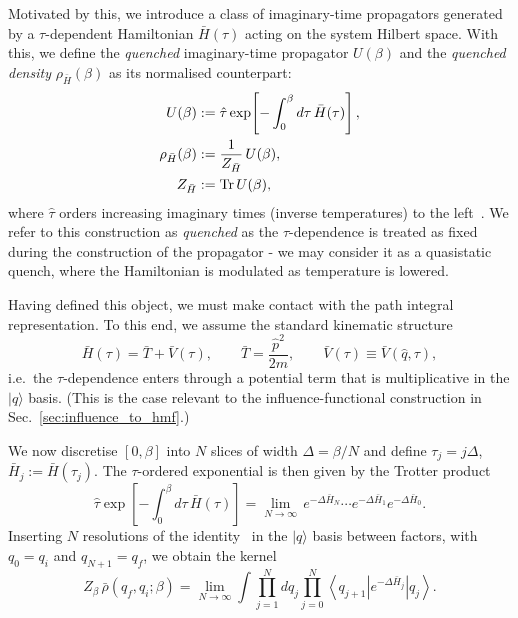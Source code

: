 Motivated by this, we introduce a class of imaginary-time propagators generated by a $\tau$-dependent Hamiltonian $\bar H(\tau)$ acting on the system Hilbert
space. With this, we define the \emph{quenched} imaginary-time propagator $U(\beta)$ and the \emph{quenched density} $\rho_{\bar H}(\beta)$ as its normalised counterpart:
\begin{equation}
\begin{split}
    U(\beta)
    &:=
    \hat\tau \exp\!\left[-\int_{0}^{\beta} d\tau\,\bar H(\tau)\right],
    \\
    \rho_{\bar H}(\beta)
    &:=
    \frac{1}{Z_{\bar H}}\, U(\beta),
    \\
    Z_{\bar H}&:=\mathrm{Tr}\, U(\beta),
\end{split}
    \label{eq:quenched_canonical_def}
\end{equation}
where $\hat\tau$ orders increasing imaginary times (inverse temperatures) to the left~\cite{feynmanQuantumMechanicsPath1965, kleinertPathIntegralsQuantum2009}. We refer to this construction as \emph{quenched} as the $\tau$-dependence is treated as fixed
during the construction of the propagator - we may consider it as a quasistatic quench, where the Hamiltonian is modulated as temperature is lowered.

Having defined this object, we must make contact with the   path integral representation. To this end, we assume the standard kinematic structure
\begin{equation}
    \bar H(\tau)=\bar T+\bar V(\tau),
    \qquad
    \bar T=\frac{\hat p^2}{2m},
    \qquad
    \bar V(\tau)\equiv \bar V(\hat q,\tau),
    \label{eq:quenched_T_plus_V}
\end{equation}
i.e.\ the $\tau$-dependence enters through a potential term that is multiplicative in the
$|q\rangle$ basis. (This is the case relevant to the influence-functional construction
in Sec.~\ref{sec:influence_to_hmf}.)

We now discretise $[0,\beta]$ into $N$ slices of width $\Delta=\beta/N$ and define
$\tau_j=j\Delta$, $\bar H_j:=\bar H(\tau_j)$. The $\tau$-ordered exponential is then
given by the Trotter product~\cite{kleinertPathIntegralsQuantum2009,schulmanTechniquesApplicationsPath1981}
\begin{equation}
    \hat\tau \exp\!\left[-\int_{0}^{\beta} d\tau\,\bar H(\tau)\right]
    =\lim_{N\to\infty}\, e^{-\Delta \bar H_{N}}\cdots e^{-\Delta \bar H_{1}}e^{-\Delta \bar H_{0}}.
    \label{eq:quenched_timeslice}
\end{equation}
Inserting $N$ resolutions of the identity~\cite{kleinertPathIntegralsQuantum2009} in the $|q\rangle$ basis between factors, with
$q_0=q_i$ and $q_{N+1}=q_f$, we obtain the kernel
\begin{equation}
    Z_\beta\,\bar\rho(q_f,q_i;\beta)
    =
    \lim_{N\to\infty}
    \int \prod_{j=1}^{N} dq_j
    \prod_{j=0}^{N}
    \left\langle q_{j+1}\right| e^{-\Delta \bar H_j}\left|q_j\right\rangle.
    \label{eq:quenched_kernel_product}
\end{equation}

